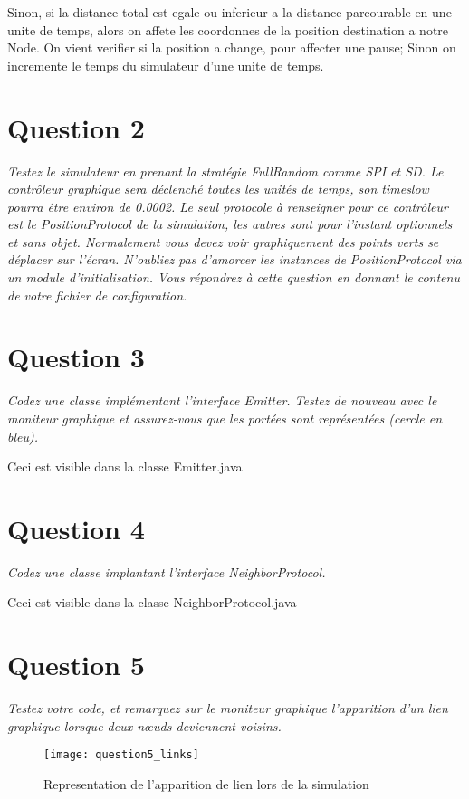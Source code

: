 \documentclass[11pt,a4paper,sans]{report}
\begin{document}
	Sinon, si la distance total est egale ou inferieur a la distance parcourable en une unite de temps, alors on affete les coordonnes de la position destination a notre Node.  On vient verifier si la position a change, pour affecter une pause; Sinon on incremente le temps du simulateur d'une unite de temps.

	\section{Question 2}
	\textit{Testez le simulateur en prenant la stratégie FullRandom comme SPI et SD. Le contrôleur graphique sera déclenché toutes les unités de temps, son timeslow pourra être environ de 0.0002. Le seul protocole à renseigner pour ce contrôleur est le PositionProtocol de la simulation, les autres sont pour l’instant optionnels et sans objet.  Normalement vous devez voir graphiquement des points verts se déplacer sur l’écran.  N’oubliez pas d’amorcer les instances de PositionProtocol via un module d’initialisation. Vous répondrez à cette question en donnant le contenu de votre fichier de configuration.}

	\newpage
	\section{Question 3}
	\textit{Codez une classe implémentant l’interface Emitter. Testez de nouveau avec le moniteur graphique et assurez-vous que les portées sont représentées (cercle en bleu).}

	Ceci est visible dans la classe Emitter.java


	\section{Question 4}
	\textit{Codez une classe implantant l’interface NeighborProtocol.}

	Ceci est visible dans la classe NeighborProtocol.java

	\section{Question 5}
	\par\textit{Testez votre code, et remarquez sur le moniteur graphique l’apparition d’un lien graphique lorsque deux nœuds deviennent voisins.}
	\begin{figure}[h]
		\centering
		\texttt{[image: question5\_links]}
		\caption{Representation de l'apparition de lien lors de la simulation}
	\end{figure}
\end{document}
